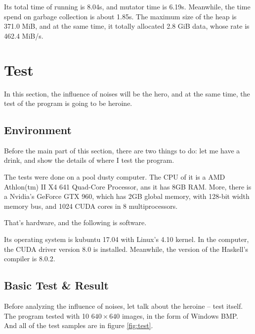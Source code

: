 \documentclass{article}
\begin{document}
Its total time of running is 8.04s, and mutator time is 6.19s. Meanwhile, the time spend on garbage collection is about 1.85s. The maximum size of the heap is  371.0 MiB,
and at the same time, it totally allocated 2.8 GiB data, whose rate is 462.4 MiB/s.

\section{Test}
\label{sec:test}

In this section, the influence of noises will be the hero, and at the same time,
the test of the program is going to be heroine.
 
\subsection{Environment}
\label{sec:test:environment}

Before the main part of this section, there are two things to do: let me have a drink,
and show the details of where I test the program.

The tests were done on a pool dusty computer. The CPU of it is a AMD Athlon(tm) II X4 641 Quad-Core Processor, ans it has 8GB RAM.
More, there is a Nvidia's GeForce GTX 960, which has 2GB global memory, with 128-bit width memory
bus, and 1024 CUDA cores in 8 multiprocessors.

That's hardware, and the following is software. 

Its operating system is kubuntu 17.04 with Linux's 4.10 kernel. In the computer,
the CUDA driver version 8.0 is installed. Meanwhile, the version of the Haskell's compiler is 
8.0.2. 

\subsection{Basic Test \& Result}

Before analyzing the influence of noises, let talk about the heroine -- test itself.
The program tested with 10 $640 \times 640$ images, in the form of Windows BMP.
And all of the test samples are in figure \ref{fig:test}.
\end{document}
